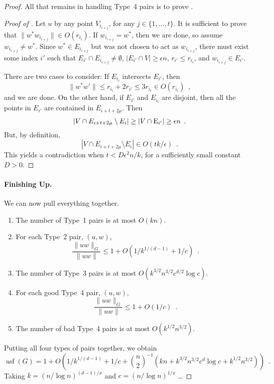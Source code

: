 \documentclass{patmorin}
\DeclareMathOperator{\asf}{asf}
\begin{document}
\begin{proof}
  All that remains in handling Type~4 pairs is to prove .

  \begin{proof}[Proof of ]
  Let $u$ by any point $V_{i_{i+j}}$, for any $j\in\{1,\ldots,t\}$.
  It is sufficient to prove that $\|w^*w_{i_{i+j}}\|\in O(r_{i_i})$.
  If $w_{i_{i+j}}=w^*$, then we are done, so assume $w_{i_{i+j}}\neq
  w^*$.  Since $w^*\in E_{i_{i+j}}$ but was not chosen to act as
  $w_{i_{i+j}}$, there must exist some index $i'$ such that $E_{i'}\cap
  E_{i_{i+j}}\neq\emptyset$, $|E_{i'}\cap V|\ge\epsilon n$, $r_{i'}\le
  r_{i_i}$, and $w_{i_{i+j}}\in E_{i'}$.

  There are two cases to consider:
  If $E_{i_i}$ intersects $E_{i'}$, then 
  \[
     \|w^*w'\|\le r_{i_i} + 2r_{i'} \le 3r_{i_i} \in O(r_{i_i}) \enspace ,
  \]
  and we are done.  On the other hand, if $E_{i'}$ and $E_{i_i}$
  are disjoint, then all the points in $E_{i'}$ are contained in
  $E_{i+t+2\mu}$.  Then
  \[
      |V\cap E_{i+t+2\mu}\setminus E_i| \ge |V\cap\mathrm{E}_{i'}| \ge \epsilon n \enspace .
  \]
  But, by definition, 
  \[
      |V\cap E_{i+t+2\mu}\setminus E_i| \in O(tk/\epsilon) \enspace .
  \]
  This yields a contradiction when $t<D \epsilon^2 n/k$, for a
  sufficiently small constant $D>0$.
  \end{proof}


  \paragraph{Finishing Up.}
  We can now pull everything together.
  \begin{enumerate}
    \item The number of Type~1 pairs is at most $O(kn)$.
    \item For each Type~2 pair, $(u,w)$, 
    \[
      \frac{\|uw\|_G}{\|uw\|}\le 1+ O(1/k^{1/(d-1)}+1/c) \enspace .
    \]
    \item The number of Type~3 pairs is at most
      $O(k^{3/2}n^{3/2}c^{d/2}\log c)$.
    \item For each good Type~4 pair, $(u,w)$, 
    \[
      \frac{\|uw\|_G}{\|uw\|}\le 1+ O(1/c) \enspace .
    \]
    \item The number of bad Type~4 pairs is at most 
       $O(k^{1/2}n^{3/2})$.
  \end{enumerate}
  Putting all four types of pairs together, we obtain
  \[
     \asf(G) = 1 + O\left(1/k^{1/(d-1)} + 1/c 
       + \binom{n}{2}^{-1}\left(kn+k^{3/2}n^{3/2}c^d\log c+k^{1/2}n^{3/2}\right)\right) \enspace .
  \]
  Taking $k=(n/\log n)^{(d-1)/x}$ and $c=(n/\log n)^{1/x}$
  \ldots 
\end{proof}
\end{document}
